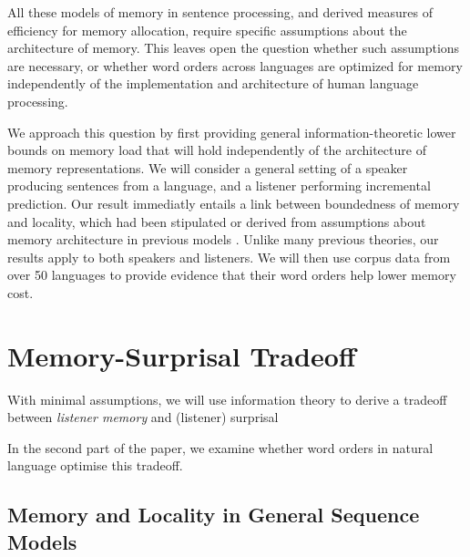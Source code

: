 \documentclass[11pt,letterpaper]{article}
\begin{document}
%
%
%
%
%





All these models of memory in sentence processing, and derived measures of efficiency for memory allocation, require specific assumptions about the architecture of memory.
This leaves open the question whether such assumptions are necessary, or whether word orders across languages are optimized for memory independently of the implementation and architecture of human language processing.


We approach this question by first providing general information-theoretic lower bounds on memory load that will hold independently of the architecture of memory representations.
We will consider a general setting of a speaker producing sentences from a language, and a listener performing incremental prediction.
Our result immediatly entails a link between boundedness of memory and locality, which had been stipulated or derived from assumptions about memory architecture in previous models \citep{gibson-linguistic-1998, lewis-activation-based-2005, futrell-noisy-context-2017}.
Unlike many previous theories, our results apply to both speakers and listeners.
We will then use corpus data from over 50 languages to provide evidence that their word orders help lower memory cost.


\section{Memory-Surprisal Tradeoff}

With minimal assumptions, we will use information theory to derive a tradeoff between \emph{listener memory} and (listener) surprisal

In the second part of the paper, we examine whether word orders in natural language optimise this tradeoff.


\subsection{Memory and Locality in General Sequence Models}
\end{document}
